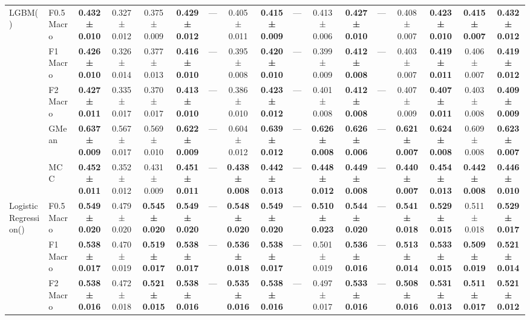 \begin{table}[H]
{\begin{tabular}{llccccccccccccccc}
\cline{1-17}
\multirow[t]{5}{*}{LGBM()} & F0.5 Macro & \textbf{0.432 ± 0.010} & 0.327 ± 0.012 & 0.375 ± 0.009 & \textbf{0.429 ± 0.012} & — & 0.405 ± 0.011 & \textbf{0.415 ± 0.009} & — & 0.413 ± 0.006 & \textbf{0.427 ± 0.010} & — & 0.408 ± 0.007 & \textbf{0.423 ± 0.010} & \textbf{0.415 ± 0.007} & \textbf{0.432 ± 0.012} \\
 & F1 Macro & \textbf{0.426 ± 0.010} & 0.326 ± 0.014 & 0.377 ± 0.013 & \textbf{0.416 ± 0.010} & — & 0.395 ± 0.008 & \textbf{0.420 ± 0.010} & — & 0.399 ± 0.009 & \textbf{0.412 ± 0.008} & — & 0.403 ± 0.007 & \textbf{0.419 ± 0.011} & 0.406 ± 0.007 & \textbf{0.419 ± 0.012} \\
 & F2 Macro & \textbf{0.427 ± 0.011} & 0.335 ± 0.017 & 0.370 ± 0.017 & \textbf{0.413 ± 0.010} & — & 0.386 ± 0.010 & \textbf{0.423 ± 0.012} & — & 0.401 ± 0.008 & \textbf{0.412 ± 0.008} & — & 0.407 ± 0.009 & \textbf{0.407 ± 0.011} & 0.403 ± 0.008 & \textbf{0.409 ± 0.009} \\
 & GMean & \textbf{0.637 ± 0.009} & 0.567 ± 0.017 & 0.569 ± 0.010 & \textbf{0.622 ± 0.009} & — & 0.604 ± 0.012 & \textbf{0.639 ± 0.012} & — & \textbf{0.626 ± 0.008} & \textbf{0.626 ± 0.006} & — & \textbf{0.621 ± 0.007} & \textbf{0.624 ± 0.008} & 0.609 ± 0.008 & \textbf{0.623 ± 0.007} \\
 & MCC & \textbf{0.452 ± 0.011} & 0.352 ± 0.012 & 0.431 ± 0.009 & \textbf{0.451 ± 0.011} & — & \textbf{0.438 ± 0.008} & \textbf{0.442 ± 0.013} & — & \textbf{0.448 ± 0.012} & \textbf{0.449 ± 0.008} & — & \textbf{0.440 ± 0.007} & \textbf{0.454 ± 0.013} & \textbf{0.442 ± 0.008} & \textbf{0.446 ± 0.010} \\
\cline{1-17}
\multirow[t]{5}{*}{LogisticRegression()} & F0.5 Macro & \textbf{0.549 ± 0.020} & 0.479 ± 0.020 & \textbf{0.545 ± 0.020} & \textbf{0.549 ± 0.020} & — & \textbf{0.548 ± 0.020} & \textbf{0.549 ± 0.020} & — & \textbf{0.510 ± 0.023} & \textbf{0.544 ± 0.020} & — & \textbf{0.541 ± 0.018} & \textbf{0.529 ± 0.015} & 0.511 ± 0.018 & \textbf{0.529 ± 0.017} \\
 & F1 Macro & \textbf{0.538 ± 0.017} & 0.470 ± 0.019 & \textbf{0.519 ± 0.017} & \textbf{0.538 ± 0.017} & — & \textbf{0.536 ± 0.018} & \textbf{0.538 ± 0.017} & — & 0.501 ± 0.019 & \textbf{0.536 ± 0.016} & — & \textbf{0.513 ± 0.014} & \textbf{0.533 ± 0.015} & \textbf{0.509 ± 0.019} & \textbf{0.521 ± 0.014} \\
 & F2 Macro & \textbf{0.538 ± 0.016} & 0.472 ± 0.018 & \textbf{0.521 ± 0.015} & \textbf{0.538 ± 0.016} & — & \textbf{0.535 ± 0.016} & \textbf{0.538 ± 0.016} & — & 0.497 ± 0.017 & \textbf{0.533 ± 0.016} & — & \textbf{0.508 ± 0.016} & \textbf{0.531 ± 0.013} & \textbf{0.511 ± 0.017} & \textbf{0.521 ± 0.012} \\

\end{tabular}}
\end{table}
